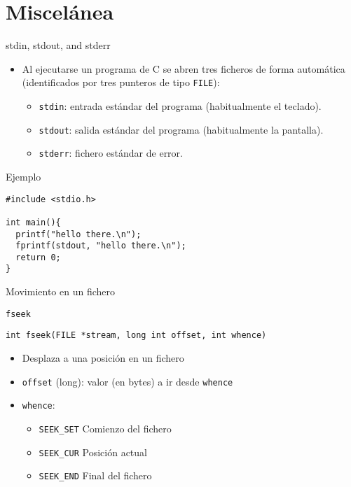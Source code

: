 \documentclass[usenames,svgnames,dvipsnames, aspectratio=169]{beamer}
\begin{document}
\section{Miscelánea}
\label{sec:org96151a8}
\begin{frame}[label={sec:orgf3ea03e},fragile]{stdin, stdout, and stderr}
 \begin{itemize}
\item Al ejecutarse un programa de C se abren tres ficheros de forma automática (identificados por tres punteros de tipo \texttt{FILE}):

\begin{itemize}
\item \texttt{stdin}: entrada estándar del programa (habitualmente el teclado).

\item \texttt{stdout}: salida estándar del programa (habitualmente la pantalla).

\item \texttt{stderr}: fichero estándar de error.
\end{itemize}
\end{itemize}

\begin{block}{Ejemplo}
\lstset{language=C,label= ,caption= ,captionpos=b,numbers=none}
\begin{lstlisting}
#include <stdio.h>

int main(){
  printf("hello there.\n");
  fprintf(stdout, "hello there.\n");
  return 0;
}
\end{lstlisting}
\end{block}
\end{frame}


\begin{frame}[label={sec:org2f05dc3},fragile]{Movimiento en un fichero}
 \begin{block}{\texttt{fseek}}
\lstset{language=C,label= ,caption= ,captionpos=b,numbers=none}
\begin{lstlisting}
int fseek(FILE *stream, long int offset, int whence)
\end{lstlisting}

\begin{itemize}
\item Desplaza a una posición en un fichero
\item \texttt{offset} (long): valor (en bytes) a ir desde \texttt{whence}
\item \texttt{whence}:
\begin{itemize}
\item \texttt{SEEK\_SET} Comienzo del fichero
\item \texttt{SEEK\_CUR} Posición actual
\item \texttt{SEEK\_END} Final del fichero
\end{itemize}
\end{itemize}
\end{block}
\end{frame}
\end{document}
